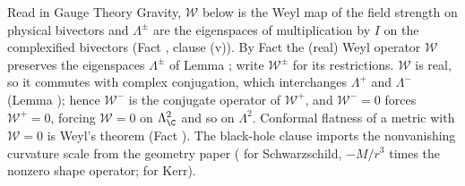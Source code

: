 Read in Gauge Theory Gravity, $\mathcal{W}$ below is the Weyl map of the field strength on physical bivectors and $\Lambda^{\pm}$ are the eigenspaces of multiplication by $I$ on the complexified bivectors (Fact , clause (v)). By Fact  the (real) Weyl operator $\mathcal{W}$ preserves the eigenspaces $\Lambda^\pm$ of Lemma ; write $\mathcal{W}^\pm$ for its restrictions. $\mathcal{W}$ is real, so it commutes with complex conjugation, which interchanges $\Lambda^+$ and $\Lambda^-$ (Lemma ); hence $\mathcal{W}^-$ is the conjugate operator of $\mathcal{W}^+$, and $\mathcal{W}^- = 0$ forces $\mathcal{W}^+ = 0$, forcing $\mathcal{W} = 0$ on $\Lambda^2_\C$ and so on $\Lambda^2$. Conformal flatness of a metric with $\mathcal{W} = 0$ is Weyl's theorem (Fact ). The black-hole clause imports the nonvanishing curvature scale from the geometry paper ( for Schwarzschild, $-M/r^3$ times the nonzero shape operator;  for Kerr).
